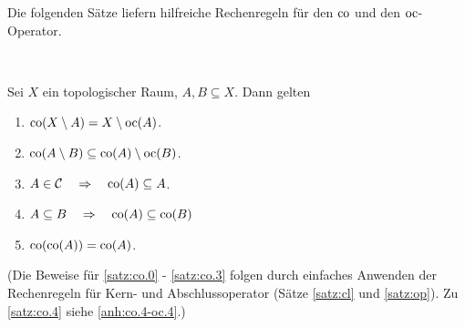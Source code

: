     Die folgenden Sätze liefern hilfreiche Rechenregeln für den $\text{co}$ und den $\text{oc}$-Operator.
    \begin{satz}\label{satz:co} \ \vspace{8pt}

        \noindent
        Sei $X$ ein topologischer Raum, $A, B \subseteq X$. Dann gelten
        \begin{enumerate}
            \item \label{satz:co.0} $\text{co}(X \setminus A) = X \setminus \text{oc}(A)$.
            \item \label{satz:co.1} $\text{co}(A \setminus B) \subseteq \text{co}(A) \setminus \text{oc}(B)$.
            \item \label{satz:co.2} $A \in \mathcal{C} \quad \Rightarrow \quad \text{co}(A) \subseteq A$.
            \item \label{satz:co.3} $A \subseteq B \quad \Rightarrow \quad \text{co}(A) \subseteq \text{co}(B)$
            \item \label{satz:co.4} $\text{co}(\text{co}(A)) = \text{co}(A)$.		
        \end{enumerate}	
        
        (Die Beweise für \ref{satz:co.0} - \ref{satz:co.3} folgen durch einfaches Anwenden der Rechenregeln für Kern- und Abschlussoperator (Sätze \ref{satz:cl} und \ref{satz:op}). Zu \ref{satz:co.4} siehe \ref{anh:co.4-oc.4}.)
    \end{satz}


